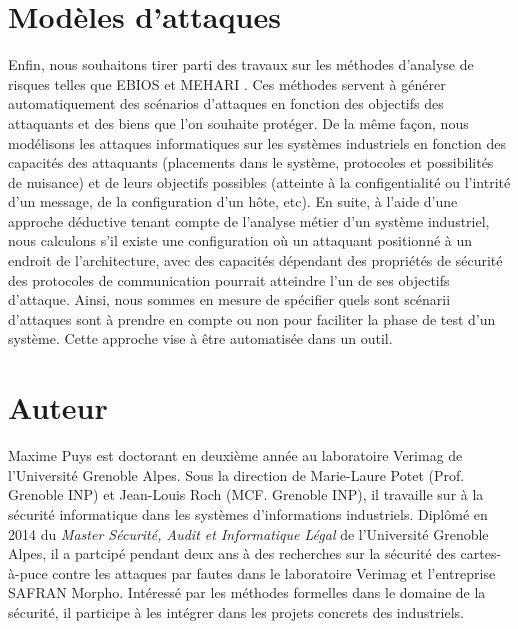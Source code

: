 \documentclass{article}
\begin{document}
\section{Modèles d'attaques}\label{sec:models}

Enfin, nous souhaitons tirer parti des travaux sur les méthodes d'analyse
de risques telles que EBIOS \cite{EBIOS} et MEHARI \cite{MEHARI}.
Ces méthodes servent à générer automatiquement des scénarios d'attaques en
fonction des objectifs des attaquants et des biens que l'on souhaite protéger.
De la même façon, nous modélisons les attaques informatiques sur les systèmes
industriels en fonction des capacités des attaquants (placements dans le
système, protocoles et possibilités de nuisance) et de leurs objectifs possibles
(atteinte à la configentialité ou  l'intrité d'un message, de la configuration
d'un hôte, etc).
En suite, à l'aide d'une approche déductive tenant compte de l’analyse métier
d’un système industriel, nous calculons s'il existe une configuration où un
attaquant positionné à un endroit de l'architecture, avec des capacités
dépendant des propriétés de sécurité des protocoles de communication pourrait
atteindre l'un de ses objectifs d'attaque.
Ainsi, nous sommes en mesure de spécifier quels sont scénarii d’attaques sont à
prendre en compte ou non pour faciliter la phase de test d'un système.
Cette approche vise à être automatisée dans un outil.

\section{Auteur}

Maxime Puys est doctorant en deuxième année au laboratoire Verimag de
l'Université Grenoble Alpes.
Sous la direction de Marie-Laure Potet (Prof. Grenoble INP) et Jean-Louis Roch
(MCF. Grenoble INP), il travaille sur à la sécurité informatique dans les
systèmes d'informations industriels.
Diplômé en 2014 du {\em Master Sécurité, Audit et Informatique Légal} de
l'Université Grenoble Alpes, il a partcipé pendant deux ans à des recherches sur
la sécurité des cartes-à-puce contre les attaques par fautes dans le laboratoire
Verimag et l'entreprise SAFRAN Morpho.
Intéressé par les méthodes formelles dans le domaine de la sécurité, il
participe à les intégrer dans les projets concrets des industriels.



\end{document}

